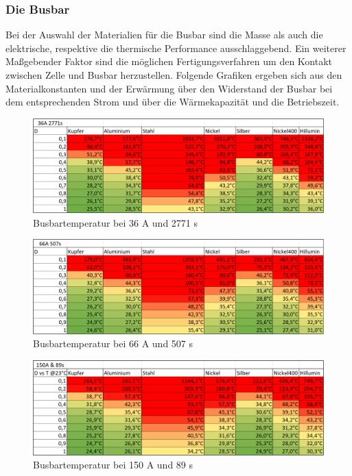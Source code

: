 \FloatBarrier
\subsubsection{Die Busbar}
 Bei der Auswahl der Materialien für die Busbar sind die Masse als auch die elektrische, respektive die thermische Performance ausschlaggebend. Ein weiterer Maßgebender Faktor sind die möglichen Fertigungsverfahren um den Kontakt zwischen Zelle und Busbar herzustellen. Folgende Grafiken ergeben sich aus den Materialkonstanten und der Erwärmung über den Widerstand der Busbar bei dem entsprechenden Strom und über die Wärmekapazität und die Betriebszeit.
 
 \begin{figure}[]
 	\centering
 	\includegraphics[width=0.7\linewidth]{bilder/Busbar_temp_36A_2771s}
 	\caption{Busbartemperatur bei 36 A und 2771 s}
 	\label{fig:Busbar_temp_36A_2771s}
 \end{figure}
\begin{figure}[]
	\centering
	\includegraphics[width=0.7\linewidth]{bilder/Busbar_temp_66A_507s}
	\caption{Busbartemperatur bei 66 A und 507 s}
	\label{fig:Busbar_temp_66A_507s}
\end{figure}
\begin{figure}[]
	\centering
	\includegraphics[width=0.7\linewidth]{bilder/Busbar_temp_150A_89s}
	\caption{Busbartemperatur bei 150 A und 89 s}
	\label{fig:Busbar_temp_150A_89s}
\end{figure}


